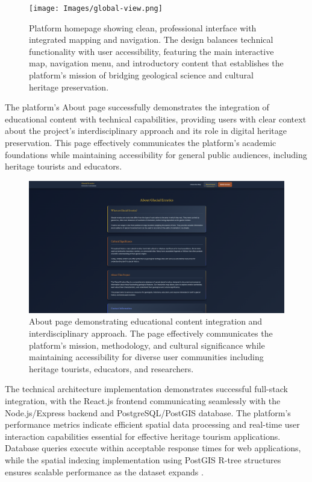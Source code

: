 \begin{figure}[htbp]
    \centering
    \texttt{[image: Images/global-view.png]}
    \caption{Platform homepage showing clean, professional interface with integrated mapping and navigation. The design balances technical functionality with user accessibility, featuring the main interactive map, navigation menu, and introductory content that establishes the platform's mission of bridging geological science and cultural heritage preservation.}
    \label{fig:homepage_overview}
\end{figure}

The platform's About page successfully demonstrates the integration of educational content with technical capabilities, providing users with clear context about the project's interdisciplinary approach and its role in digital heritage preservation. This page effectively communicates the platform's academic foundations while maintaining accessibility for general public audiences, including heritage tourists and educators.

\begin{figure}[htbp]
    \centering
    \includegraphics[width=\textwidth]{Images/AboutPage.png}
    \caption{About page demonstrating educational content integration and interdisciplinary approach. The page effectively communicates the platform's mission, methodology, and cultural significance while maintaining accessibility for diverse user communities including heritage tourists, educators, and researchers.}
    \label{fig:about_page}
\end{figure}

The technical architecture implementation demonstrates successful full-stack integration, with the React.js frontend communicating seamlessly with the Node.js/Express backend and PostgreSQL/PostGIS database. The platform's performance metrics indicate efficient spatial data processing and real-time user interaction capabilities essential for effective heritage tourism applications. Database queries execute within acceptable response times for web applications, while the spatial indexing implementation using PostGIS R-tree structures ensures scalable performance as the dataset expands \cite{Guttman1984}.

